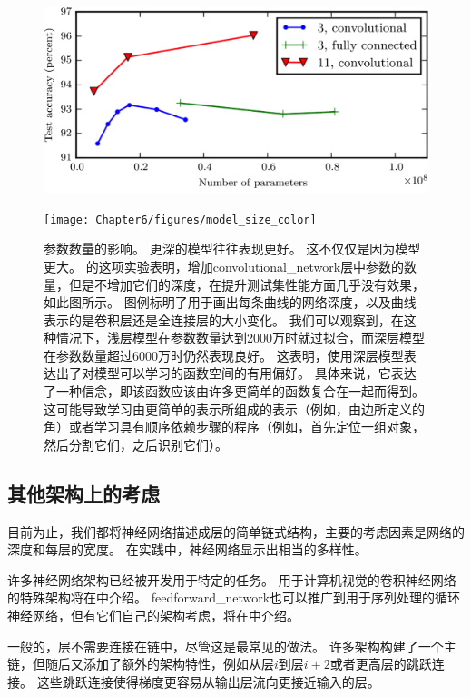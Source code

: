 \begin{figure}[!htb]
\ifOpenSource
\centerline{\includegraphics[scale=0.5]{images/49.png}}
\else
\centerline{\texttt{[image: Chapter6/figures/model\_size\_color]}}
\fi
\caption{参数数量的影响。
更深的模型往往表现更好。
这不仅仅是因为模型更大。
\cite{Goodfellow-et-al-2014d}的这项实验表明，增加\gls{convolutional_network}层中参数的数量，但是不增加它们的深度，在提升测试集性能方面几乎没有效果，如此图所示。
图例标明了用于画出每条曲线的网络深度，以及曲线表示的是卷积层还是全连接层的大小变化。
我们可以观察到，在这种情况下，浅层模型在参数数量达到2000万时就过拟合，而深层模型在参数数量超过6000万时仍然表现良好。
这表明，使用深层模型表达出了对模型可以学习的函数空间的有用偏好。
具体来说，它表达了一种信念，即该函数应该由许多更简单的函数复合在一起而得到。
这可能导致学习由更简单的表示所组成的表示（例如，由边所定义的角）或者学习具有顺序依赖步骤的程序（例如，首先定位一组对象，然后分割它们，之后识别它们）。}
\label{fig:chap6_model_size_color}
\end{figure}

\subsection{其他架构上的考虑}
\label{sec:other_architectural_considerations}

目前为止，我们都将神经网络描述成层的简单链式结构，主要的考虑因素是网络的深度和每层的宽度。
在实践中，神经网络显示出相当的多样性。

许多神经网络架构已经被开发用于特定的任务。
用于计算机视觉的卷积神经网络的特殊架构将在中介绍。
\gls{feedforward_network}也可以推广到用于序列处理的循环神经网络，但有它们自己的架构考虑，将在中介绍。


一般的，层不需要连接在链中，尽管这是最常见的做法。
许多架构构建了一个主链，但随后又添加了额外的架构特性，例如从层$i$到层$i+2$或者更高层的跳跃连接。
这些跳跃连接使得梯度更容易从输出层流向更接近输入的层。

